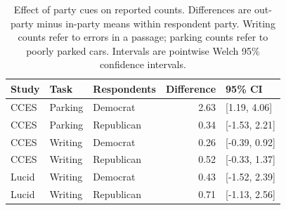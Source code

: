 \begin{table}[ht]
\centering
\caption{Effect of party cues on reported counts. Differences are out-party minus in-party means within respondent party. Writing counts refer to errors in a passage; parking counts refer to poorly parked cars. Intervals are pointwise Welch 95\% confidence intervals.}
\label{tab:effects}
\begin{tabular}{lllrl}
  \toprule
Study & Task & Respondents & Difference & 95\% CI \\
  \midrule
CCES & Parking & Democrat & 2.63 & [1.19, 4.06] \\
  CCES & Parking & Republican & 0.34 & [-1.53, 2.21] \\
  CCES & Writing & Democrat & 0.26 & [-0.39, 0.92] \\
  CCES & Writing & Republican & 0.52 & [-0.33, 1.37] \\
  Lucid & Writing & Democrat & 0.43 & [-1.52, 2.39] \\
  Lucid & Writing & Republican & 0.71 & [-1.13, 2.56] \\
   \bottomrule
\end{tabular}
\end{table}
